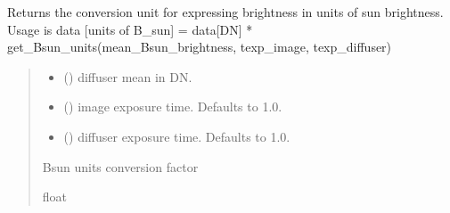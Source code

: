 \documentclass[letterpaper,10pt,english]{sphinxmanual}
\begin{document}
\begin{fulllineitems}
\label{\detokenize{micropolarray:micropolarray.utils.get_Bsun_units}}
\pysigstartsignatures
{}
\pysigstopsignatures
\sphinxAtStartPar
Returns the conversion unit for expressing brightness in units of sun brightness. Usage is
data {[}units of B\_sun{]} = data{[}DN{]} * get\_Bsun\_units(mean\_Bsun\_brightness, texp\_image, texp\_diffuser)
\begin{quote}\begin{description}
\begin{itemize}
\item {} 
\sphinxAtStartPar
{} () \textendash{} diffuser mean in DN.

\item {} 
\sphinxAtStartPar
{} (\sphinxstyleliteralemphasis{\sphinxupquote{, }}) \textendash{} image exposure time. Defaults to 1.0.

\item {} 
\sphinxAtStartPar
{} (\sphinxstyleliteralemphasis{\sphinxupquote{, }}) \textendash{} diffuser exposure time. Defaults to 1.0.

\end{itemize}

\sphinxAtStartPar
Bsun units conversion factor

\sphinxAtStartPar
float

\end{description}\end{quote}

\end{fulllineitems}
\end{document}
